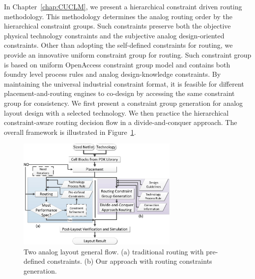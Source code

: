       In Chapter~\ref{chap:CUCLM}, we present a hierarchical constraint driven routing methodology. This methodology determines the analog routing order by the hierarchical constraint groups. Such constraints preserve both the objective physical technology constraints and the subjective  analog design-oriented constraints. Other than adopting the self-defined constraints for routing, we provide an innovative uniform constraint group for routing. Such constraint group is based on uniform OpenAccess constraint group model and contains both foundry level process rules and analog design-knowledge constraints. By maintaining the universal industrial constraint format, it is feasible for different placement-and-routing engines to co-design by accessing the same constraint group for consistency. We first present a constraint group generation for analog layout design with a selected technology. We then practice the hierarchical constraint-aware routing decision flow in a divide-and-conquer approach. The overall framework is illustrated in Figure~\ref{fig:LayoutFlow}. 
    
      \begin{figure}[ht]
          \centerline{
            \includegraphics[width=0.7\textwidth]{Fig/Introduction/LayoutFlow.eps}
          }
          \caption{Two analog layout general flow. (a) traditional routing with pre-defined constraints. (b) Our approach with routing constraints generation. }
          \label{fig:LayoutFlow}
        \end{figure}


